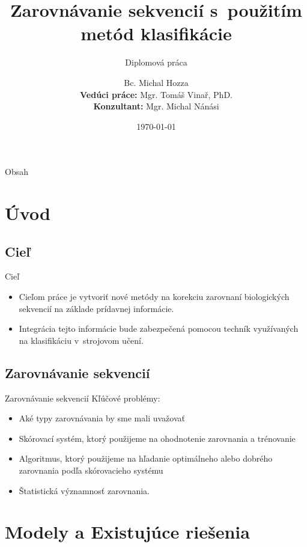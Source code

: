 \documentclass[xcolor=dvipsnames, compress, 12pt, t]{beamer}
\title{Zarovnávanie sekvencií s~použitím metód klasifikácie}
\subtitle{
\vspace{0.5cm}
\small Diplomová práca
}
\author[Michal Hozza]{\small Bc. Michal Hozza \\ \vspace{1cm} \footnotesize \textbf{Vedúci práce:} Mgr. Tomáš Vinař, PhD. \\ \textbf{Konzultant:} Mgr. Michal Nánási\\ \vspace{.5cm}}
\institute[FMFI UK \insertshortdate]{
  Fakulta matematiky, fyziky a informatiky,
  Univerzita Komenského, Bratislava\\
}
\date[\the\year]{\footnotesize \today}
\begin{document}
\begin{frame}[plain]
  \titlepage
\end{frame}


\begin{frame}{Obsah}
  \transdissolve[duration=0.1]
  \begin{multicols}{2}
  \tableofcontents
  \end{multicols}
\end{frame}


\section{Úvod}
\subsection{Cieľ}
\begin{frame}{Cieľ}
  \begin{itemize}
  \item Cieľom práce je vytvoriť nové metódy na korekciu zarovnaní biologických sekvencií na základe prídavnej informácie.
  \item Integrácia tejto informácie bude zabezpečená pomocou techník využívaných na klasifikáciu v~strojovom učení.
  \end{itemize}
\end{frame}


\subsection{Zarovnávanie sekvencií}
\begin{frame}{Zarovnávanie sekvencií}
Kľúčové problémy:
  \begin{itemize}
    \pause
    \item Aké typy zarovnávania by sme mali uvažovať
    \pause
    \item Skórovací systém, ktorý použijeme na ohodnotenie zarovnania a trénovanie
    \pause
    \item Algoritmus, ktorý použijeme na hľadanie optimálneho alebo dobrého zarovnania podľa skórovacieho systému
    \pause
    \item Štatistická významnosť zarovnania.
  \end{itemize}
\end{frame}

\section{Modely a Existujúce riešenia}
\end{document}
